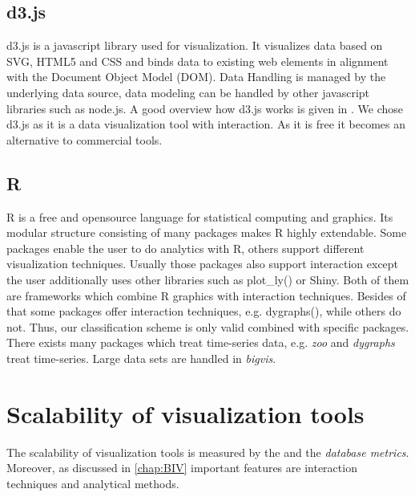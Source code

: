 \subsection*{d3.js}
d3.js is a javascript library used for visualization. It visualizes data based on SVG, HTML5 and CSS and binds data to existing web elements in alignment with the Document Object Model (DOM).  Data Handling is managed by the underlying data source, data modeling can be handled by other javascript libraries such as node.js. A good overview how d3.js works is given in \cite{Meeks}. 
We chose d3.js as it is a data visualization tool with interaction. As it is free it becomes an alternative to commercial tools.

\subsection*{R}
R is a free and opensource language for statistical computing and graphics. Its modular structure consisting of many packages makes R highly extendable\cite{R}. Some packages enable the user to do analytics with R, others support different visualization techniques. Usually those packages also support interaction except the user additionally uses other libraries such as plot\_ly() or Shiny. Both of them are frameworks which combine R graphics with interaction techniques. Besides of that some packages offer interaction techniques, e.g. dygraphs(), while others do not. Thus, our classification scheme is only valid combined with specific packages.
There exists many packages which treat time-series data, e.g. \textit{zoo} and \textit{dygraphs} treat time-series. Large data sets are handled in \textit{bigvis}.

\section{Scalability of visualization tools}
The scalability of visualization tools is measured by the  and the \textit{database metrics}. Moreover, as discussed in \ref{chap:BIV} important features are interaction techniques and analytical methods. 

